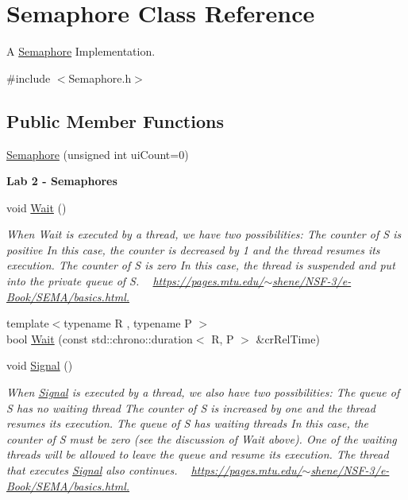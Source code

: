 \hypertarget{class_semaphore}{}\section{Semaphore Class Reference}
\label{class_semaphore}


A \hyperlink{class_semaphore}{Semaphore} Implementation.  




{\ttfamily \#include $<$Semaphore.\+h$>$}

\subsection*{Public Member Functions}
\begin{DoxyCompactItemize}
\item 
\hyperlink{class_semaphore_a0d9290d316636875ca85d1d78950a817}{Semaphore} (unsigned int ui\+Count=0)
\end{DoxyCompactItemize}
\begin{Indent}\textbf{ Lab 2 -\/ Semaphores}\par
{\em }\begin{DoxyCompactItemize}
\item 
void \hyperlink{class_semaphore_a72aabebf026e3a8b1f3e4d0fa8ee1eda}{Wait} ()
\begin{DoxyCompactList}\small\item\em When Wait is executed by a thread, we have two possibilities\+: The counter of S is positive In this case, the counter is decreased by 1 and the thread resumes its execution. The counter of S is zero In this case, the thread is suspended and put into the private queue of S. ~\newline
\hyperlink{}{https\+://pages.\+mtu.\+edu/$\sim$shene/\+N\+S\+F-\/3/e-\/\+Book/\+S\+E\+M\+A/basics.\+html.}\end{DoxyCompactList}\item 
{\footnotesize template$<$typename R , typename P $>$ }\\bool \hyperlink{class_semaphore_a7f700173ae86ae623684109066e07656}{Wait} (const std\+::chrono\+::duration$<$ R, P $>$ \&cr\+Rel\+Time)
\item 
void \hyperlink{class_semaphore_a86f92f738b4486439b296d8e235895f2}{Signal} ()
\begin{DoxyCompactList}\small\item\em When \hyperlink{class_signal}{Signal} is executed by a thread, we also have two possibilities\+: The queue of S has no waiting thread The counter of S is increased by one and the thread resumes its execution. The queue of S has waiting threads In this case, the counter of S must be zero (see the discussion of Wait above). One of the waiting threads will be allowed to leave the queue and resume its execution. The thread that executes \hyperlink{class_signal}{Signal} also continues. ~\newline
\hyperlink{}{https\+://pages.\+mtu.\+edu/$\sim$shene/\+N\+S\+F-\/3/e-\/\+Book/\+S\+E\+M\+A/basics.\+html.}\end{DoxyCompactList}\end{DoxyCompactItemize}
\end{Indent}


